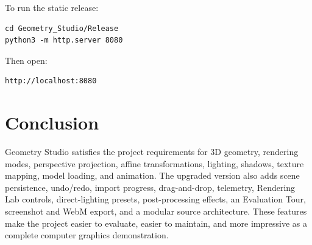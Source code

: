 \documentclass[12pt,a4paper]{article}
\begin{document}
To run the static release:
\begin{verbatim}
cd Geometry_Studio/Release
python3 -m http.server 8080
\end{verbatim}

Then open:
\begin{verbatim}
http://localhost:8080
\end{verbatim}

\section{Conclusion}

Geometry Studio satisfies the project requirements for 3D geometry,
rendering modes, perspective projection, affine transformations, lighting,
shadows, texture mapping, model loading, and animation. The upgraded version
also adds scene persistence, undo/redo, import progress, drag-and-drop, telemetry,
Rendering Lab controls, direct-lighting presets, post-processing effects, an
Evaluation Tour, screenshot and WebM export, and a modular source architecture.
These features make the project easier to evaluate, easier to maintain, and more
impressive as a complete computer graphics demonstration.
\end{document}
